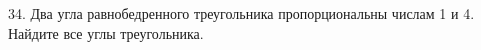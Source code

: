 34. Два угла равнобедренного треугольника пропорциональны числам 1 и 4. Найдите все углы треугольника.\\
